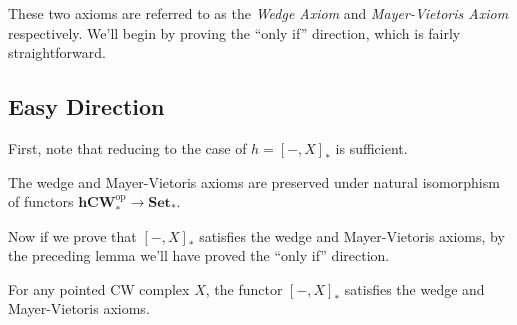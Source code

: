 \documentclass[11pt,letterpaper]{article}
\providecommand{\hcwop}{\mathbf{hCW}^{\textrm{op}}_*}
\providecommand{\Set}{\mathbf{Set}_*}
\begin{document}
These two axioms are referred to as the \emph{Wedge Axiom} and \emph{Mayer-Vietoris Axiom} respectively. We'll begin by proving the ``only if'' direction, which is fairly straightforward. 

\subsection{Easy Direction}

First, note that reducing to the case of $h = [-, X]_*$ is sufficient.

\begin{lemma}
    The wedge and Mayer-Vietoris axioms are preserved under natural isomorphism of functors $\hcwop \to \Set$.
\end{lemma}

Now if we prove that $[-, X]_*$ satisfies the wedge and Mayer-Vietoris axioms, by the preceding lemma we'll have proved the ``only if'' direction.

\begin{lemma}
    For any pointed CW complex $X$, the functor $[-,X]_*$ satisfies the wedge and Mayer-Vietoris axioms.
\end{lemma}
\end{document}
